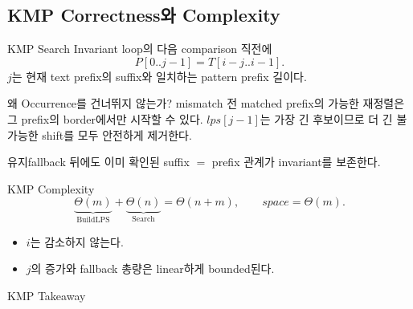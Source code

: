 \subsection{KMP Correctness와 Complexity}
\begin{frame}{KMP Search Invariant}
loop의 다음 comparison 직전에
\[
P[0..j-1]=T[i-j..i-1].
\]
\(j\)는 현재 text prefix의 suffix와 일치하는 pattern prefix 길이다.
\end{frame}
\begin{frame}{왜 Occurrence를 건너뛰지 않는가?}
mismatch 전 matched prefix의 가능한 재정렬은 그 prefix의 border에서만 시작할 수 있다. \(lps[j-1]\)는 가장 긴 후보이므로 더 긴 불가능한 shift를 모두 안전하게 제거한다.
\begin{block}{유지}fallback 뒤에도 이미 확인된 suffix \(=\) prefix 관계가 invariant를 보존한다.\end{block}
\end{frame}
\begin{frame}{KMP Complexity}
\[
\underbrace{\Theta(m)}_{\text{BuildLPS}}
+\underbrace{\Theta(n)}_{\text{Search}}
=\Theta(n+m),\qquad space=\Theta(m).
\]
\begin{itemize}\item \(i\)는 감소하지 않는다.\item \(j\)의 증가와 fallback 총량은 linear하게 bounded된다.\end{itemize}
\end{frame}
\begin{frame}{KMP Takeaway}
\end{frame}
